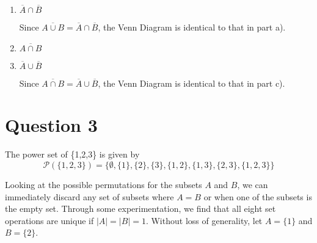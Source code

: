 \documentclass[11pt, oneside]{article}   	%
\begin{document}
\begin{enumerate}[ (a)]
    
    
    
    \item $\overline{A} \cap \overline{B}$ 
    
    Since $\overline{A \cup B} = \overline{A} \cap \overline{B}$, the Venn Diagram is identical to that in part a).
    
              
    \item $\overline{A \cap B}$
    
    
    \item $\overline{A} \cup \overline{B}$
    
    Since $\overline{A \cap B} = \overline{A} \cup \overline{B}$, the Venn Diagram is identical to that in part c).        
        
\end{enumerate}



\section*{Question 3}

The power set of \{1,2,3\} is given by
$$\mathcal{P}(\{1,2,3\}) = \{ \emptyset, \{1\}, \{2\}, \{3\}, \{1, 2\}, \{1, 3\}, \{2, 3\}, \{1, 2, 3\} \}$$

Looking at the possible permutations for the subsets $A$ and $B$, we can immediately discard any set of subsets where $A = B$ or when one of the subsets is the empty set. Through some experimentation, we find that all eight set operations are unique if $|A| = |B| = 1$. Without loss of generality, let $A=\{1\}$ and $B=\{2\}$.
\end{document}
